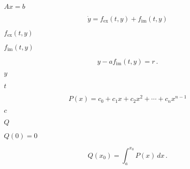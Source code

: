 \documentclass{article}
\begin{document}
$ A x = b $
\pagebreak

\[ \dot{y} = f_\mathrm{ex}(t, y) + f_\mathrm{im}(t, y) \]
\pagebreak

$ f_\mathrm{ex}(t, y) $
\pagebreak

$ f_\mathrm{im}(t, y) $
\pagebreak

\[ y - a f_\mathrm{im}(t, y) = r \,. \]
\pagebreak

$ y $
\pagebreak

$ t $
\pagebreak

\[ P(x) = c_0 + c_1 x + c_2 x^2 + \cdots + c_n x^{n-1} \]
\pagebreak

$ c $
\pagebreak

$ Q $
\pagebreak

$ Q(0) = 0 $
\pagebreak

\[ Q(x_0) = \int_a^{x_0} P(x)\,dx \,. \]
\pagebreak
\end{document}
